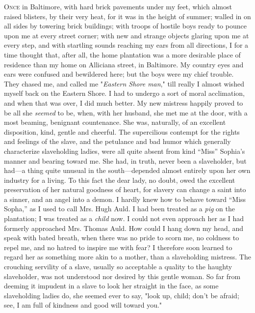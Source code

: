 \textsc{Once} in Baltimore, with hard brick pavements under my feet,
which almost raised blisters, by their very heat, for it was in the
height of summer; walled in on all sides by towering brick buildings;
with troops of hostile boys ready to pounce upon me at every street
corner; with new and strange objects glaring upon me at every step, and
with startling sounds reaching my ears from all directions, I for a time
thought that, after all, the home plantation was a more desirable place
of residence than my home on Alliciana street, in Baltimore. My country
eyes and ears were confused and bewildered here; but the boys were my
chief trouble. They chased me, and called me "\emph{Eastern Shore man},"
till really I almost wished myself back on the Eastern Shore. I had to
undergo a sort {\protect\hypertarget{142}{}{}}of moral acclimation, and
when that was over, I did much better. My new mistress happily proved to
be all she \emph{seemed} to be, when, with her husband, she met me at
the door, with a most beaming, benignant countenance. She was,
naturally, of an excellent disposition, kind, gentle and cheerful. The
supercilious contempt for the rights and feelings of the slave, and the
petulance and bad humor which generally characterize slaveholding
ladies, were all quite absent from kind ``Miss'' Sophia's manner and
bearing toward me. She had, in truth, never been a slaveholder, but
had---a thing quite unusual in the south---depended almost entirely upon
her own industry for a living. To this fact the dear lady, no doubt,
owed the excellent preservation of her natural goodness of heart, for
slavery can change a saint into a sinner, and an angel into a demon. I
hardly knew how to behave toward ``Miss Sopha,'' as I used to call Mrs.
Hugh Auld. I had been treated as a \emph{pig} on the plantation; I was
treated as a \emph{child} now. I could not even approach her as I had
formerly approached Mrs. Thomas Auld. How could I hang down my head, and
speak with bated breath, when there was no pride to scorn me, no
coldness to repel me, and no hatred to inspire me with fear? I therefore
soon learned to regard her as something more akin to a mother, than a
slaveholding mistress. The crouching servility of a slave, usually so
acceptable a quality to the haughty slaveholder, was not understood nor
desired by this gentle woman. So far from deeming it impudent in a slave
to look her straight in the face, as some slaveholding ladies do, she
seemed ever to say, "look up, {\protect\hypertarget{143}{}{}}child;
don't be afraid; see, I am full of kindness and good will toward you."

